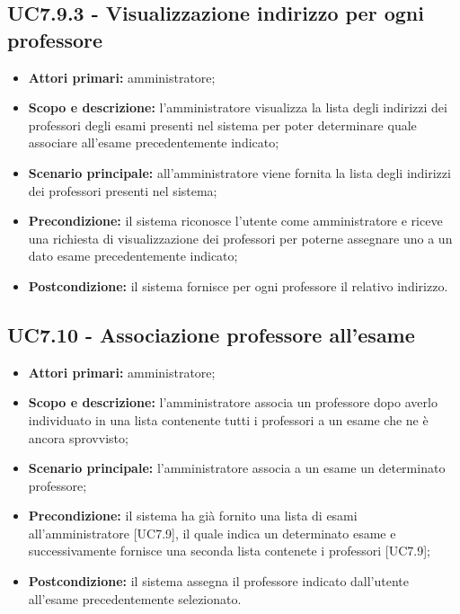 \documentclass[AnalisiDeiRequisiti.tex]{subfiles}
\begin{document}
\subsection{UC7.9.3 - Visualizzazione indirizzo per ogni professore}
\begin{itemize}
	\item \textbf{Attori primari:} amministratore;
	\item \textbf{Scopo e descrizione:} l'amministratore visualizza la lista degli indirizzi dei professori degli esami presenti nel sistema per poter determinare quale associare all'esame precedentemente indicato;
	\item \textbf{Scenario principale:} all'amministratore viene fornita la lista degli indirizzi dei professori presenti nel sistema;
	\item \textbf{Precondizione:} il sistema riconosce l'utente come amministratore e riceve una richiesta di visualizzazione dei professori per poterne assegnare uno a un dato esame precedentemente indicato; 
	\item \textbf{Postcondizione:} il sistema fornisce per ogni professore il relativo indirizzo.
\end{itemize}
\subsection{UC7.10 - Associazione professore all'esame}
\begin{itemize}
	\item \textbf{Attori primari:} amministratore;
	\item \textbf{Scopo e descrizione:} l'amministratore associa un professore dopo averlo individuato in una lista contenente tutti i professori a un esame che ne è ancora sprovvisto;
	\item \textbf{Scenario principale:} l'amministratore associa a un esame un determinato professore;
	\item \textbf{Precondizione:} il sistema ha già fornito una lista di esami all'amministratore [UC7.9], il quale indica un determinato esame e successivamente fornisce una seconda lista contenete i professori [UC7.9]; 
	\item \textbf{Postcondizione:} il sistema assegna il professore indicato dall'utente all'esame precedentemente selezionato.
\end{itemize}
\end{document}
